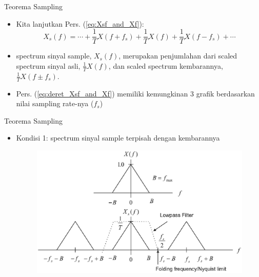 \documentclass[pdflatex,compress,mathserif]{beamer}
\begin{document}
\begin{frame}{Teorema Sampling}
    \begin{itemize}
        \item Kita lanjutkan Pers. (\ref{eq:Xsf_and_Xf}):
        \begin{equation}
            X_s(f) = \cdots + \frac{1}{T}X(f+f_s) + \frac{1}{T}X(f) + \frac{1}{T}X(f-f_s) + \cdots
            \label{eq:deret_Xsf_and_Xf}
        \end{equation}
        \item spectrum sinyal sample, $X_s(f)$, merupakan penjumlahan dari scaled spectrum sinyal asli, $ \frac{1}{T} X(f) $, dan scaled spectrum kembarannya, $ \frac{1}{T} X(f \pm f_s) $.
        \item Pers. (\ref{eq:deret_Xsf_and_Xf}) memiliki kemungkinan 3 grafik berdasarkan nilai sampling rate-nya ($f_s$)
    \end{itemize}
\end{frame}

\begin{frame}{Teorema Sampling}
    \begin{itemize}
        \item Kondisi 1: spectrum sinyal sample terpisah dengan kembarannya
        \begin{figure}
            \includegraphics[width=0.9\linewidth]{./img/img09}
            \label{img:09}
        \end{figure}
    \end{itemize}
\end{frame}
\end{document}
